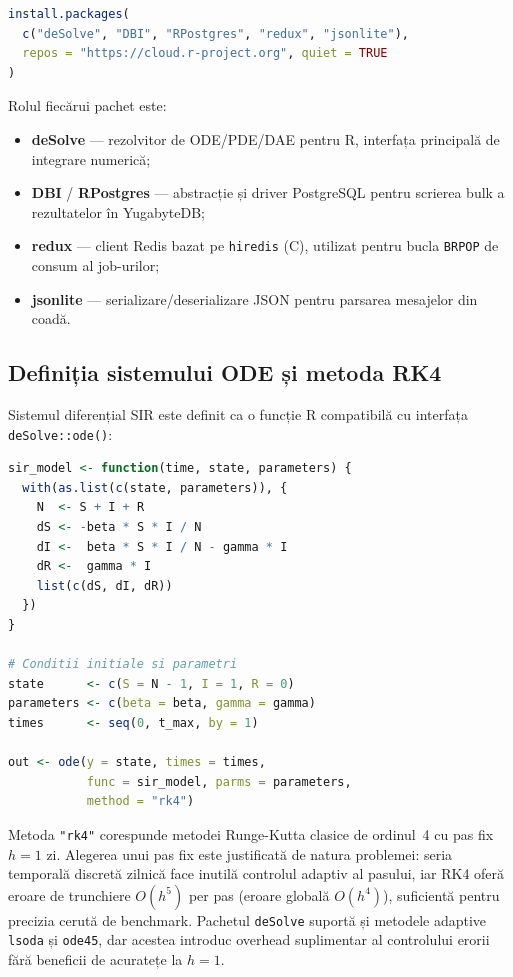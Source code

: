\begin{lstlisting}[language=R, caption={Dependențele runner-ului R.}]
install.packages(
  c("deSolve", "DBI", "RPostgres", "redux", "jsonlite"),
  repos = "https://cloud.r-project.org", quiet = TRUE
)
\end{lstlisting}

Rolul fiecărui pachet este:
\begin{itemize}
  \item \textbf{deSolve} \cite{soetaert2010desolve} --- rezolvitor de ODE/PDE/DAE
    pentru R, interfața principală de integrare numerică;
  \item \textbf{DBI} / \textbf{RPostgres} --- abstracție și driver PostgreSQL
    pentru scrierea bulk a rezultatelor în YugabyteDB;
  \item \textbf{redux} --- client Redis bazat pe \texttt{hiredis} (C),
    utilizat pentru bucla \texttt{BRPOP} de consum al job-urilor;
  \item \textbf{jsonlite} --- serializare/deserializare JSON pentru parsarea
    mesajelor din coadă.
\end{itemize}

\subsection{Definiția sistemului ODE și metoda RK4}
\label{subsec:r_desolve}

Sistemul diferențial SIR este definit ca o funcție R compatibilă cu
interfața \texttt{deSolve::ode()}:

\begin{lstlisting}[language=R, caption={Definiția sistemului SIR în R și apelul \texttt{ode()}.}]
sir_model <- function(time, state, parameters) {
  with(as.list(c(state, parameters)), {
    N  <- S + I + R
    dS <- -beta * S * I / N
    dI <-  beta * S * I / N - gamma * I
    dR <-  gamma * I
    list(c(dS, dI, dR))
  })
}

# Conditii initiale si parametri
state      <- c(S = N - 1, I = 1, R = 0)
parameters <- c(beta = beta, gamma = gamma)
times      <- seq(0, t_max, by = 1)

out <- ode(y = state, times = times,
           func = sir_model, parms = parameters,
           method = "rk4")
\end{lstlisting}

Metoda \texttt{"rk4"} corespunde metodei Runge-Kutta clasice de ordinul~4
cu pas fix $h = 1$ zi. Alegerea unui pas fix este justificată de natura
problemei: seria temporală discretă zilnică face inutilă controlul adaptiv
al pasului, iar RK4 oferă eroare de trunchiere $O(h^5)$ per pas (eroare
globală $O(h^4)$), suficientă pentru precizia cerută de benchmark.
Pachetul \texttt{deSolve} suportă și metodele adaptive \texttt{lsoda} și
\texttt{ode45}, dar acestea introduc overhead suplimentar al controlului
erorii fără beneficii de acuratețe la $h = 1$.


